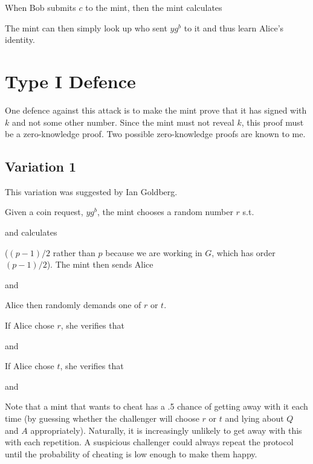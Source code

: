 \documentclass[a4paper,titlepage]{article}
\begin{document}
When Bob submits $c$ to the mint, then the mint calculates


The mint can then simply look up who sent $y g^b$ to it and thus learn
Alice's identity.

\section{Type I Defence}

One defence against this attack is to make the mint prove that it has
signed with $k$ and not some other number. Since the mint must not
reveal $k$, this proof must be a zero-knowledge proof. Two possible
zero-knowledge proofs are known to me.

\subsection{Variation 1}

This variation was suggested by Ian Goldberg.

Given a coin request, $y g^b$, the mint chooses a random number $r$
 s.t.


and calculates


($(p-1)/2$ rather than $p$ because we are working in $G$, which has order
$(p-1)/2$). The mint then sends Alice


and


Alice then randomly demands one of $r$ or $t$.

If Alice chose $r$, she verifies that


and


If Alice chose $t$, she verifies that


and


Note that a mint that wants to cheat has a .5 chance of getting away
with it each time (by guessing whether the challenger will choose $r$
or $t$ and lying about $Q$ and $A$ appropriately). Naturally, it is
increasingly unlikely to get away with this with each repetition. A
suspicious challenger could always repeat the protocol until the
probability of cheating is low enough to make them happy.
\end{document}
